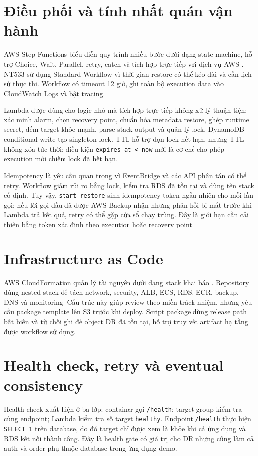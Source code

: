 \section{Điều phối và tính nhất quán vận hành}

AWS Step Functions biểu diễn quy trình nhiều bước dưới dạng state machine, hỗ trợ Choice, Wait, Parallel, retry, catch và tích hợp trực tiếp với dịch vụ AWS \cite{aws-step-functions}. NT533 sử dụng Standard Workflow vì thời gian restore có thể kéo dài và cần lịch sử thực thi. Workflow có timeout 12 giờ, ghi toàn bộ execution data vào CloudWatch Logs và bật tracing.

Lambda được dùng cho logic nhỏ mà tích hợp trực tiếp không xử lý thuận tiện: xác minh alarm, chọn recovery point, chuẩn hóa metadata restore, ghép runtime secret, đếm target khỏe mạnh, parse stack output và quản lý lock. DynamoDB conditional write tạo singleton lock. TTL hỗ trợ dọn lock hết hạn, nhưng TTL không xóa tức thời; điều kiện \texttt{expires\_at < now} mới là cơ chế cho phép execution mới chiếm lock đã hết hạn.

Idempotency là yêu cầu quan trọng vì EventBridge và các API phân tán có thể retry. Workflow giảm rủi ro bằng lock, kiểm tra RDS đã tồn tại và dùng tên stack cố định. Tuy vậy, \texttt{start-restore} sinh idempotency token ngẫu nhiên cho mỗi lần gọi; nếu lời gọi đầu đã được AWS Backup nhận nhưng phản hồi bị mất trước khi Lambda trả kết quả, retry có thể gặp cửa sổ chạy trùng. Đây là giới hạn cần cải thiện bằng token xác định theo execution hoặc recovery point.

\section{Infrastructure as Code}

AWS CloudFormation quản lý tài nguyên dưới dạng stack khai báo \cite{aws-cloudformation}. Repository dùng nested stack để tách network, security, ALB, ECS, RDS, ECR, backup, DNS và monitoring. Cấu trúc này giúp review theo miền trách nhiệm, nhưng yêu cầu package template lên S3 trước khi deploy. Script package dùng release path bất biến và từ chối ghi đè object DR đã tồn tại, hỗ trợ truy vết artifact hạ tầng được workflow sử dụng.

\section{Health check, retry và eventual consistency}

Health check xuất hiện ở ba lớp: container gọi \texttt{/health}; target group kiểm tra cùng endpoint; Lambda kiểm tra số target \texttt{healthy}. Endpoint \texttt{/health} thực hiện \texttt{SELECT 1} trên database, do đó target chỉ được xem là khỏe khi cả ứng dụng và RDS kết nối thành công. Đây là health gate có giá trị cho DR nhưng cũng làm cả auth và order phụ thuộc database trong ứng dụng demo.

